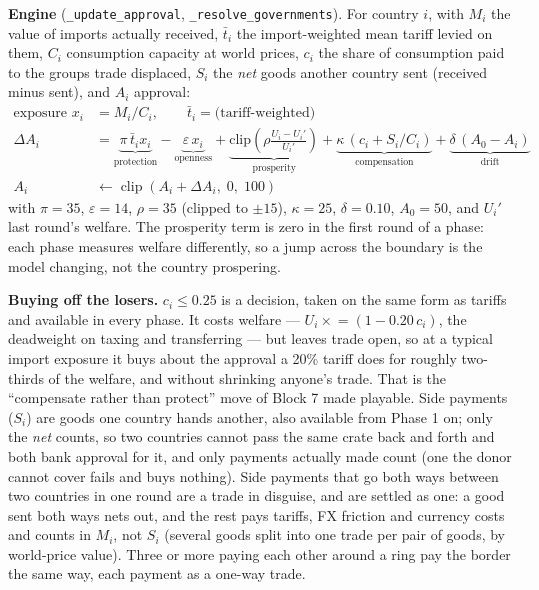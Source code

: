 \documentclass[11pt]{article}
\newcommand{\code}[1]{\texttt{#1}}
\begin{document}
\textbf{Engine} (\code{\_update\_approval}, \code{\_resolve\_governments}).
For country $i$, with $M_i$ the value of imports actually received,
$\bar t_i$ the import-weighted mean tariff levied on them, $C_i$ consumption
capacity at world prices, $c_i$ the share of consumption paid to the groups
trade displaced, $S_i$ the \emph{net} goods another country sent
(received minus sent), and $A_i$ approval:
\begin{align*}
\text{exposure } x_i &= M_i / C_i, \qquad \bar t_i = \text{(tariff-weighted)}\\
\Delta A_i &= \underbrace{\pi\,\bar t_i x_i}_{\text{protection}}
 - \underbrace{\varepsilon\, x_i}_{\text{openness}}
 + \underbrace{\text{clip}\!\left(\rho \tfrac{U_i - U_i'}{U_i'}\right)}_{\text{prosperity}}
 + \underbrace{\kappa\,(c_i + S_i / C_i)}_{\text{compensation}}
 + \underbrace{\delta\,(A_0 - A_i)}_{\text{drift}}\\
A_i &\leftarrow \operatorname{clip}\left(A_i + \Delta A_i,\; 0,\; 100\right)
\end{align*}
with $\pi=35$, $\varepsilon=14$, $\rho=35$ (clipped to $\pm 15$), $\kappa=25$,
$\delta=0.10$, $A_0=50$, and $U_i'$ last round's welfare. The prosperity term
is zero in the first round of a phase: each phase measures welfare differently,
so a jump across the boundary is the model changing, not the country prospering.

\textbf{Buying off the losers.} $c_i \le 0.25$ is a decision, taken on the same
form as tariffs and available in every phase. It costs welfare ---
$U_i \mathrel{\times}= (1 - 0.20\,c_i)$, the deadweight on taxing and transferring
--- but leaves trade open, so at a typical import exposure it buys about the
approval a 20\% tariff does for roughly two-thirds of the welfare, and without
shrinking anyone's trade. That is the ``compensate rather than protect'' move of
Block 7 made playable. Side payments ($S_i$) are goods one country hands another,
also available from Phase 1 on; only the \emph{net} counts, so two countries
cannot pass the same crate back and forth and both bank approval for it, and
only payments actually made count (one the donor cannot cover fails and buys
nothing). Side payments that go both ways between two countries in one round
are a trade in disguise, and are settled as one: a good sent both ways nets
out, and the rest pays tariffs, FX friction and currency costs and counts in
$M_i$, not $S_i$ (several goods split into one trade per pair of goods, by
world-price value). Three or more paying each other around a ring pay the
border the same way, each payment as a one-way trade.
\end{document}
